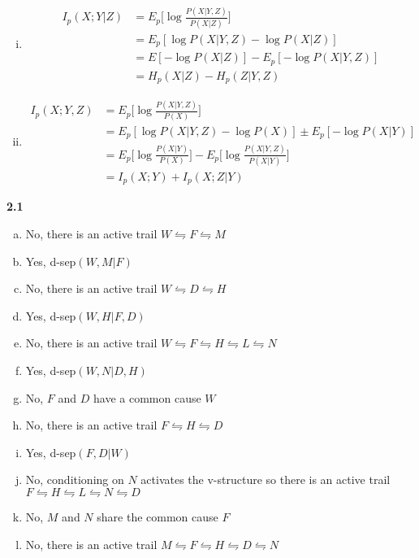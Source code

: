 \documentclass{article}
\begin{document}
\begin{enumerate}[(a)]
\begin{enumerate}[(i)]
        \item \begin{align*}
            I_p(X;Y|Z) &= E_p \bigg[ \log \frac{P(X|Y,Z)}{P(X|Z)}\bigg] \\[0.25ex]
            &= E_p [ \log P(X|Y,Z) - \log P(X|Z)] \\
            &= E[-\log P(X|Z)] - E_p[-\log P(X|Y,Z)] \\
            &= H_p(X|Z) - H_p(Z|Y,Z)
        \end{align*}
        \item \begin{align*}
            I_p(X;Y,Z) &= E_p\bigg[\log \frac{P(X|Y,Z)}{P(X)}\bigg] \\
            &= E_p[\log P(X|Y,Z) - \log P(X)] \pm  E_p[-\log P(X|Y)] \\
            &= E_p \bigg[\log \frac{P(X|Y)}{P(X)}\bigg] - E_p \bigg[\log \frac{P(X|Y,Z)}{P(X|Y)}\bigg] \\
            &= I_p(X;Y) + I_p(X;Z|Y)
        \end{align*}
    \end{enumerate}
\end{enumerate}
\textbf{2.1} \begin{enumerate}[(a)]
    \item No, there is an active trail $W \leftrightharpoons F \leftrightharpoons M$
    \item Yes, d-sep$(W, M | F)$ 
    \item No, there is an active trail $W \leftrightharpoons D \leftrightharpoons H$
    \item Yes, d-sep$(W, H | F, D)$
    \item No, there is an active trail $W \leftrightharpoons F \leftrightharpoons H \leftrightharpoons L \leftrightharpoons N$
    \item Yes, d-sep$(W, N | D, H)$
    \item No, $F$ and $D$ have a common cause $W$
    \item No, there is an active trail $F \leftrightharpoons H \leftrightharpoons D$
    \item Yes, d-sep$(F, D | W)$
    \item No, conditioning on $N$ activates the v-structure so there is an active trail $F \leftrightharpoons H \leftrightharpoons L \leftrightharpoons N \leftrightharpoons D$
    \item No, $M$ and $N$ share the common cause $F$
    \item No, there is an active trail $M \leftrightharpoons F \leftrightharpoons H \leftrightharpoons D \leftrightharpoons N$
\end{enumerate}
\end{document}

